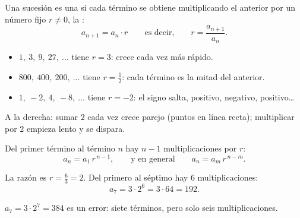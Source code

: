\documentclass[11pt,a4paper]{article}
\begin{document}
\begin{definicion}
Una sucesión es una  si cada término se obtiene multiplicando el anterior por un número
fijo $r\neq 0$, la :
\[ a_{n+1}=a_n\cdot r\qquad\text{es decir,}\qquad r=\frac{a_{n+1}}{a_n}. \]
\end{definicion}
\begin{minipage}[c]{0.44\linewidth}
\begin{itemize}
\item $1,\ 3,\ 9,\ 27,\ \dots$ tiene $r=3$: crece cada vez más rápido.
\item $800,\ 400,\ 200,\ \dots$ tiene $r=\frac12$: cada término es la mitad del anterior.
\item $1,\ -2,\ 4,\ -8,\ \dots$ tiene $r=-2$: el signo salta, positivo, negativo, positivo\dots
\end{itemize}
\smallskip
{\small\color{zmute}A la derecha: sumar $2$ cada vez crece parejo (puntos en línea recta); multiplicar por $2$ empieza
lento y se dispara.}
\end{minipage}\hfill
\begin{minipage}[c]{0.53\linewidth}\centering
{}
\end{minipage}

\begin{propiedad}
Del primer término al término $n$ hay $n-1$ multiplicaciones por $r$:
\[ a_n=a_1\,r^{\,n-1},\qquad\text{y en general}\qquad a_n=a_m\,r^{\,n-m}. \]
\end{propiedad}
\begin{ejemplo}
La razón es $r=\frac63=2$. Del primero al séptimo hay $6$ multiplicaciones:
\[ a_7=3\cdot 2^{6}=3\cdot 64=192 . \]
\end{ejemplo}
\begin{ojo}
$a_7=3\cdot 2^{7}=384$ es un error: siete términos, pero solo seis multiplicaciones.
\end{ojo}
\end{document}
